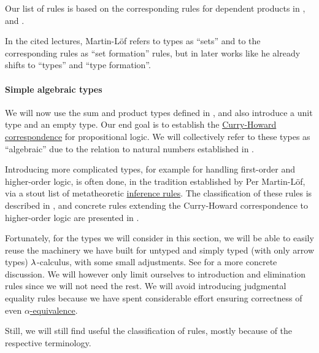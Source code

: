 \begin{comments}
  \item Our list of rules is based on the corresponding rules for dependent products in , \cite[\S A.2.4]{UnivalentFoundationsProgram2024OctoberHoTT} and \cite[\S 8.1.10]{Mimram2020ProgramEqualsProof}.

  \item In the cited lectures, Martin-L\"of refers to types as \enquote{sets} and to the corresponding rules as \enquote{set formation} rules, but in later works like \cite{MartinLöf1994TypeJudgments} he already shifts to \enquote{types} and \enquote{type formation}.
\end{comments}

\paragraph{Simple algebraic types}

\begin{remark}\label{rem:extended_simple_type_theory}
  We will now use the sum and product types defined in , and also introduce a unit type and an empty type. Our end goal is to establish the \hyperref[con:curry_howard_correspondence]{Curry-Howard correspondence} for propositional logic. We will collectively refer to these types as \enquote{algebraic} due to the relation to natural numbers established in .

  Introducing more complicated types, for example for handling first-order and higher-order logic, is often done, in the tradition established by Per Martin-L\"of, via a stout list of metatheoretic \hyperref[def:inference_rule]{inference rules}. The classification of these rules is described in , and concrete rules extending the Curry-Howard correspondence to higher-order logic are presented in .

  Fortunately, for the types we will consider in this section, we will be able to easily reuse the machinery we have built for untyped and simply typed (with only arrow types) \( {\mathrm \lambda} \)-calculus, with some small adjustments. See  for a more concrete discussion. We will however only limit ourselves to introduction and elimination rules since we will not need the rest. We will avoid introducing judgmental equality rules because we have spent considerable effort ensuring correctness of even \hyperref[def:lambda_term_alpha_equivalence]{\( \alpha \)-equivalence}.

  Still, we will still find useful the classification of rules, mostly because of the respective terminology.
\end{remark}


